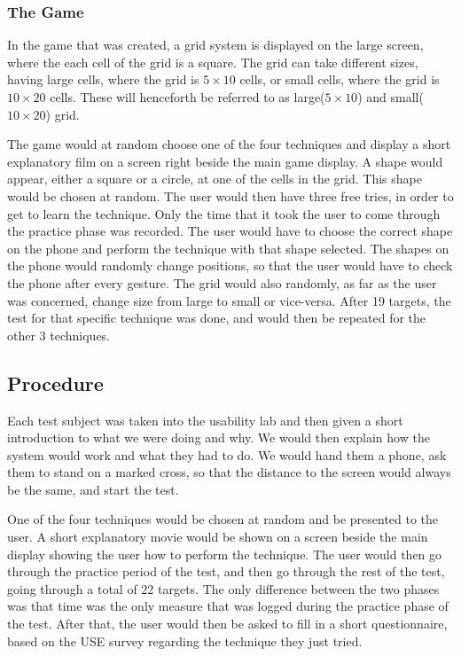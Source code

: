\subsubsection{The Game}


In the game that was created, a grid system is displayed on the large screen, where the each cell of the grid is a square. The grid can take different sizes, having large cells, where the grid is $5 \times 10$ cells, or small cells, where the grid is $10 \times 20$ cells. These will henceforth be referred to as large($5 \times 10$) and small($10 \times 20$) grid.

The game would at random choose one of the four techniques and display a short explanatory film on a screen right beside the main game display. A shape would appear, either a square or a circle, at one of the cells in the grid. This shape would be chosen at random. The user would then have three free tries, in order to get to learn the technique. Only the time that it took the user to come through the practice phase was recorded. The user would have to choose the correct shape on the phone and perform the technique with that shape selected. The shapes on the phone would randomly change positions, so that the user would have to check the phone after every gesture. The grid would also randomly, as far as the user was concerned, change size from large to small or vice-versa. After 19 targets, the test for that specific technique was done, and would then be repeated for the other 3 techniques. 

\subsection{Procedure}

Each test subject was taken into the usability lab and then given a short introduction to what we were doing and why. We would then explain how the system would work and what they had to do. We would hand them a phone, ask them to stand on a marked cross, so that the distance to the screen would always be the same, and start the test.

One of the four techniques would be chosen at random and be presented to the user. A short explanatory movie would be shown on a screen beside the main display showing the user how to perform the technique. The user would then go through the practice period of the test, and then go through the rest of the test, going through a total of 22 targets. The only difference between the two phases was that time was the only measure that was logged during the practice phase of the test. After that, the user would then be asked to fill in a short questionnaire, based on the USE survey  regarding the technique they just tried. 

